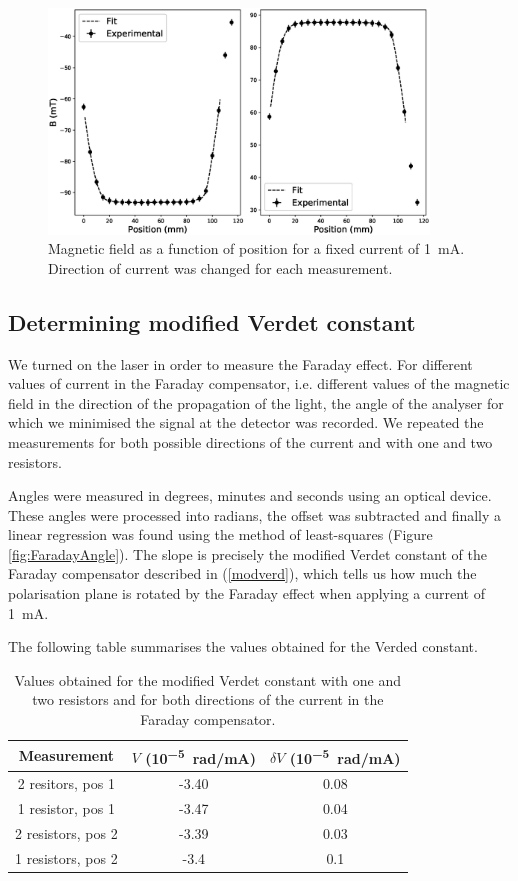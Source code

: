 \documentclass[11pt,a4paper]{article}
\begin{document}
\begin{figure}[H]
\centering
\includegraphics[width=0.9\textwidth]{B_diff_position2.eps}
\caption{Magnetic field as a function of position for a fixed current of \SI{1}{\mA}. Direction of current was changed for each measurement.}
\label{fig:BvsPos2}
\end{figure}

\subsection{Determining modified Verdet constant}

We turned on the laser in order to measure the Faraday effect. For different values of current in the Faraday compensator, i.e. different values of the magnetic field in the direction of the propagation of the light, the angle of the analyser for which we minimised the signal at the detector was recorded. We repeated the measurements for both possible directions of the current and with one and two resistors.

Angles were measured in degrees, minutes and seconds using an optical device. These angles were processed into radians, the offset was subtracted and finally a linear regression was found using the method of least-squares (Figure \ref{fig:FaradayAngle}). The slope is precisely the modified Verdet constant of the Faraday compensator described in (\ref{modverd}), which tells us how much the polarisation plane is rotated by the Faraday effect when applying a current of \SI{1}{mA}.

The following table summarises the values obtained for the Verded constant.

\begin{table}[H]
\centering
\begin{tabular}{ccc}
\toprule
Measurement & $V$ (\si{10^{-5}.\radian/\mA}) & $\delta V$ (\si{10^{-5}.\radian/\mA})\\
\midrule
2 resitors, pos 1 & -3.40 & 0.08 \\
1 resistor, pos 1 & -3.47 & 0.04 \\
2 resistors, pos 2 & -3.39 & 0.03 \\
1 resistors, pos 2 & -3.4 & 0.1 \\
\bottomrule
\end{tabular}
\caption{Values obtained for the modified Verdet constant with one and two resistors and for both directions of the current in the Faraday compensator.}
\label{table:verdet}
\end{table}
\end{document}

